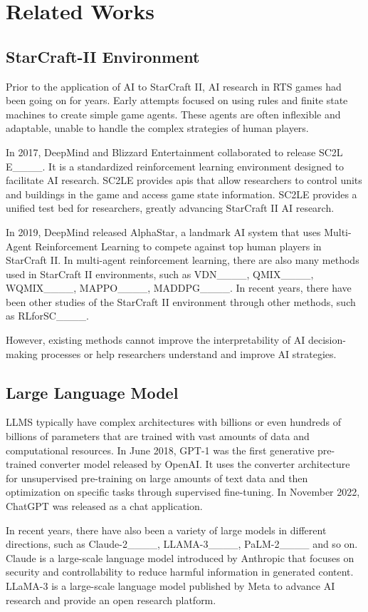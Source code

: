 \section{Related Works}
\subsection{StarCraft-II Environment}
Prior to the application of AI to StarCraft II, AI research in RTS games had been going on for years. Early attempts focused on using rules and finite state machines to create simple game agents. These agents are often inflexible and adaptable, unable to handle the complex strategies of human players. 

In 2017, DeepMind and Blizzard Entertainment collaborated to release SC2L
E____. It is a standardized reinforcement learning environment designed to facilitate AI research. SC2LE provides apis that allow researchers to control units and buildings in the game and access game state information. SC2LE provides a unified test bed for researchers, greatly advancing StarCraft II AI research. 

In 2019, DeepMind released AlphaStar, a landmark AI system that uses Multi-Agent Reinforcement Learning to compete against top human players in StarCraft II. In multi-agent reinforcement learning, there are also many methods used in StarCraft II environments, such as VDN____, QMIX____, WQMIX____, MAPPO____, MADDPG____. In recent years, there have been other studies of the StarCraft II environment through other methods, such as RLforSC____.

However, existing methods cannot improve the interpretability of AI decision-making processes or help researchers understand and improve AI strategies.


\subsection{Large Language Model}
LLMS typically have complex architectures with billions or even hundreds of billions of parameters that are trained with vast amounts of data and computational resources. In June 2018, GPT-1 was the first generative pre-trained converter model released by OpenAI. It uses the converter architecture for unsupervised pre-training on large amounts of text data and then optimization on specific tasks through supervised fine-tuning. In November 2022, ChatGPT was released as a chat application. 

In recent years, there have also been a variety of large models in different directions, such as Claude-2____, LLAMA-3____, PaLM-2____ and so on. Claude is a large-scale language model introduced by Anthropic that focuses on security and controllability to reduce harmful information in generated content. LLaMA-3 is a large-scale language model published by Meta to advance AI research and provide an open research platform. 

